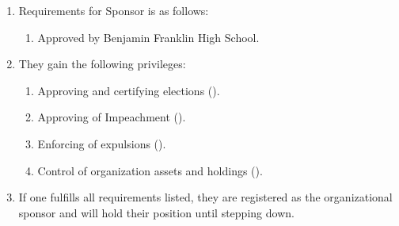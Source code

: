 \begin{enumerate}
	\item Requirements for Sponsor is as follows:
		\begin{enumerate}
			\item Approved by Benjamin Franklin High School.
		\end{enumerate}

	\item They gain the following privileges:
		\begin{enumerate}
			\item Approving and certifying elections ().

			\item Approving of Impeachment ().

			\item Enforcing of expulsions ().

			\item Control of organization assets and holdings ().
		\end{enumerate}

	\item If one fulfills all requirements listed, they are registered as the
		organizational sponsor and will hold their position until stepping down.
\end{enumerate}